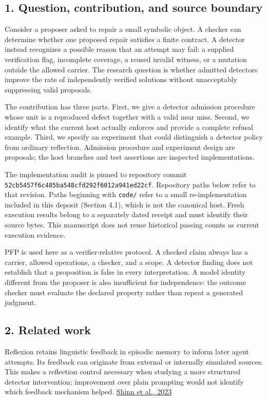 \documentclass[
  11pt,
]{article}
\newcommand{\passthrough}[1]{#1}
\begin{document}
\subsection{1. Question, contribution, and source
boundary}\label{question-contribution-and-source-boundary}

Consider a proposer asked to repair a small symbolic object. A checker
can determine whether one proposed repair satisfies a finite contract. A
detector instead recognizes a possible reason that an attempt may fail:
a supplied verification flag, incomplete coverage, a reused invalid
witness, or a mutation outside the allowed carrier. The research
question is whether admitted detectors improve the rate of independently
verified solutions without unacceptably suppressing valid proposals.

The contribution has three parts. First, we give a detector admission
procedure whose unit is a reproduced defect together with a valid near
miss. Second, we identify what the current host actually enforces and
provide a complete refusal example. Third, we specify an experiment that
could distinguish a detector policy from ordinary reflection. Admission
procedure and experiment design are proposals; the host branches and
test assertions are inspected implementations.

The implementation audit is pinned to repository commit
\nolinkurl{52cb5457f6c485ba548cfd292f6012a941ed22cf}. Repository paths
below refer to that revision. Paths beginning with
\passthrough{\lstinline!code/!} refer to a small re-implementation
included in this deposit (Section 4.1), which is not the canonical host.
Fresh execution results belong to a separately dated receipt and must
identify their source bytes. This manuscript does not reuse historical
passing counts as current execution evidence.

PFP is used here as a verifier-relative protocol. A checked claim always
has a carrier, allowed operations, a checker, and a scope. A detector
finding does not establish that a proposition is false in every
interpretation. A model identity different from the proposer is also
insufficient for independence: the outcome checker must evaluate the
declared property rather than repeat a generated judgment.

\subsection{2. Related work}\label{related-work}

Reflexion retains linguistic feedback in episodic memory to inform later
agent attempts. Its feedback can originate from external or internally
simulated sources. This makes a reflection control necessary when
studying a more structured detector intervention; improvement over plain
prompting would not identify which feedback mechanism helped.
\href{https://arxiv.org/abs/2303.11366v4}{Shinn et al., 2023}
\end{document}
